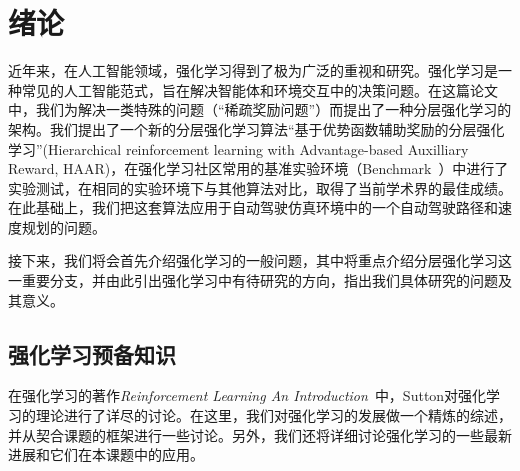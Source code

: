 \chapter{绪论}
近年来，在人工智能领域，强化学习得到了极为广泛的重视和研究。强化学习是一种常见的人工智能范式，旨在解决智能体和环境交互中的决策问题。在这篇论文中，我们为解决一类特殊的问题（``稀疏奖励问题''）而提出了一种分层强化学习的架构。我们提出了一个新的分层强化学习算法``基于优势函数辅助奖励的分层强化学习''(Hierarchical reinforcement learning with Advantage-based Auxilliary Reward, HAAR)，在强化学习社区常用的基准实验环境（Benchmark~\cite{benchmarking_RL}）中进行了实验测试，在相同的实验环境下与其他算法对比，取得了当前学术界的最佳成绩。在此基础上，我们把这套算法应用于自动驾驶仿真环境中的一个自动驾驶路径和速度规划的问题。

接下来，我们将会首先介绍强化学习的一般问题，其中将重点介绍分层强化学习这一重要分支，并由此引出强化学习中有待研究的方向，指出我们具体研究的问题及其意义。

\section{强化学习预备知识}
  在强化学习的著作\textit{Reinforcement Learning An Introduction}~\cite{Sutton_book}中，Sutton对强化学习的理论进行了详尽的讨论。在这里，我们对强化学习的发展做一个精炼的综述，并从契合课题的框架进行一些讨论。另外，我们还将详细讨论强化学习的一些最新进展和它们在本课题中的应用。
